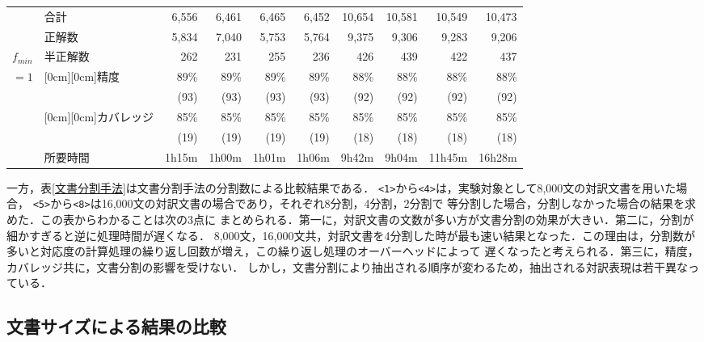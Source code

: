 \begin{table}[t]
\begin{center}
\begin{tabular}{l|l||r|r|r|r|r|r|r|r}
& 合計    & 6,556  &  6,461  &  6,465  & 6,452 & 10,654  &  10,581 &  10,549  & 10,473 \\
& 正解数  &  5,834 &  7,040  &  5,753  & 5,764 &  9,375  &  9,306  &  9,283  &  9,206  \\ 
$f_{min}$ 
& 半正解数&    262 &    231  &    255  &   236 &    426  &    439  &    422  &   437   \\ \cline{2-10}
$=1$      
&\raisebox{-1.5ex}[0cm][0cm]{精度} 
          & 89\%& 89\%& 89\%& 89\%& 88\%& 88\%& 88\%& 88\%\\
&         & (93)& (93)& (93)& (93)& (92)& (92)& (92)& (92)\\\cline{2-10}
&\raisebox{-1.5ex}[0cm][0cm]{カバレッジ}
          & 85\%& 85\%& 85\%& 85\%& 85\%& 85\%& 85\%& 85\%\\
&         & (19)& (19)& (19)& (19)& (18)& (18)& (18)&(18)\\ \cline{2-10}
&所要時間 &1h15m &1h00m &1h01m &1h06m &9h42m&9h04m&11h45m&16h28m\\
\hline
\end{tabular}
\end{center}
\end{table}

一方，表\ref{文書分割手法}は文書分割手法の分割数による比較結果である．
\verb|<1>|から\verb|<4>|は，実験対象として8,000文の対訳文書を用いた場合，
\verb|<5>|から\verb|<8>|は16,000文の対訳文書の場合であり，それぞれ8分割，4分割，2分割で
等分割した場合，分割しなかった場合の結果を求めた．この表からわかることは次の3点に
まとめられる．第一に，対訳文書の文数が多い方が文書分割の効果が大きい．第二に，分割が
細かすぎると逆に処理時間が遅くなる．
8,000文，16,000文共，対訳文書を4分割した時が最も速い結果となった．この理由は，分割数が
多いと対応度の計算処理の繰り返し回数が増え，この繰り返し処理のオーバーヘッドによって
遅くなったと考えられる．第三に，精度，カバレッジ共に，文書分割の影響を受けない．
しかし，文書分割により抽出される順序が変わるため，抽出される対訳表現は若干異なっている．
　
\subsection{文書サイズによる結果の比較}

